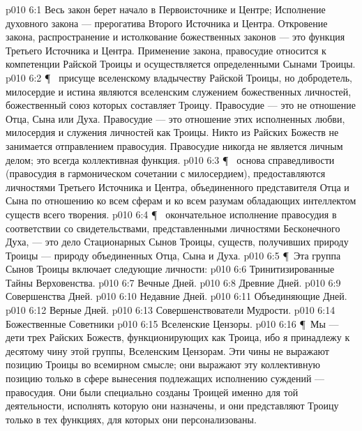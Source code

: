 \vs p010 6:1 Весь закон берет начало в Первоисточнике и Центре;  Исполнение духовного закона --- прерогатива Второго Источника и Центра. Откровение закона, распространение и истолкование божественных законов --- это функция Третьего Источника и Центра. Применение закона, правосудие относится к компетенции Райской Троицы и осуществляется определенными Сынами Троицы.
\vs p010 6:2 \P\  присуще вселенскому владычеству Райской Троицы, но добродетель, милосердие и истина являются вселенским служением божественных личностей, божественный союз которых составляет Троицу. Правосудие --- это не отношение Отца, Сына или Духа. Правосудие --- это отношение этих исполненных любви, милосердия и служения личностей как Троицы. Никто из Райских Божеств не занимается отправлением правосудия. Правосудие никогда не является личным делом; это всегда коллективная функция.
\vs p010 6:3 \P\  основа справедливости (правосудия в гармоническом сочетании с милосердием), предоставляются личностями Третьего Источника и Центра, объединенного представителя Отца и Сына по отношению ко всем сферам и ко всем разумам обладающих интеллектом существ всего творения.
\vs p010 6:4 \P\  окончательное исполнение правосудия в соответствии со свидетельствами, представленными личностями Бесконечного Духа, --- это дело Стационарных Сынов Троицы, существ, получивших природу Троицы --- природу объединенных Отца, Сына и Духа.
\vs p010 6:5 \P\ Эта группа Сынов Троицы включает следующие личности:
\vs p010 6:6 \bibnobreakspace Тринитизированные Тайны Верховенства.
\vs p010 6:7 \bibnobreakspace Вечные Дней.
\vs p010 6:8 \bibnobreakspace Древние Дней.
\vs p010 6:9 \bibnobreakspace Совершенства Дней.
\vs p010 6:10 \bibnobreakspace Недавние Дней.
\vs p010 6:11 \bibnobreakspace Объединяющие Дней.
\vs p010 6:12 \bibnobreakspace Верные Дней.
\vs p010 6:13 \bibnobreakspace Совершенствователи Мудрости.
\vs p010 6:14 \bibnobreakspace Божественные Советники
\vs p010 6:15 \bibnobreakspace Вселенские Цензоры.
\vs p010 6:16 \P\ Мы --- дети трех Райских Божеств, функционирующих как Троица, ибо я принадлежу к десятому чину этой группы, Вселенским Цензорам. Эти чины не выражают позицию Троицы во всемирном смысле; они выражают эту коллективную позицию только в сфере вынесения подлежащих исполнению суждений --- правосудия. Они были специально созданы Троицей именно для той деятельности, исполнять которую они назначены, и они представляют Троицу только в тех функциях, для которых они персонализованы.

